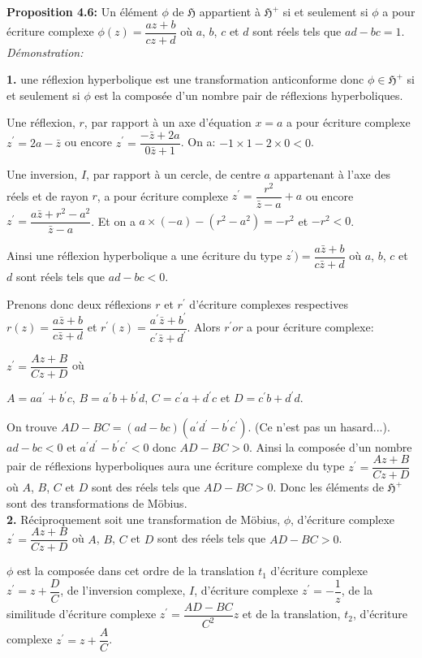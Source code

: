 \documentclass[a4paper, 12pt, twoside]{book}
\begin{document}
 \textbf{Proposition 4.6:} Un élément $\phi$ de \textbf{$\mathfrak{H}$} appartient à \textbf{$\mathfrak{H}^{+}$} si et seulement si $\phi$ a pour écriture complexe $\phi(z)=\dfrac{az+b}{cz+d}$ où $a$, $b$, $c$ et $d$ sont réels tels que $ad-bc=1$.\\
 
 
 \textit{Démonstration:}\
 
 \textbf{1.} une réflexion hyperbolique est une transformation anticonforme donc $\phi\in \mathfrak{H}^{+}$ si et seulement si  $\phi$ est la composée d'un nombre pair de réflexions hyperboliques.\
 
 Une réflexion, $r$, par rapport à un axe d'équation $x=a$ a pour écriture complexe $z^{'}=2a-\bar{z}$ ou encore  $z^{'}=\dfrac{-\bar{z}+2a}{0\bar{z}+1}$.  On a: $-1\times1-2\times 0<0$.\
 
  Une inversion, $I$, par rapport à un cercle, de centre $a$ appartenant à l'axe des réels et de rayon $r$,  a pour écriture complexe $z^{'}=\dfrac{r^{2}}{\bar{z}-a}+a$ ou encore  $z^{'}=\dfrac{a\bar{z}+r^{2}-a^{2}}{\bar{z}-a}$. Et on a $a\times (-a)-(r^{2}-a^{2})=-r^{2}$ et $-r^{2}<0$.
  
  Ainsi une réflexion hyperbolique a une écriture du type $z^{'})=\dfrac{a\bar{z}+b}{c\bar{z}+d}$ où $a$, $b$, $c$ et $d$ sont réels tels que $ad-bc<0$.\
  
  Prenons donc deux réflexions $r$ et $r^{'}$ d'écriture complexes respectives $r(z)=\dfrac{a\bar{z}+b}{c\bar{z}+d}$ et $r^{'}(z)=\dfrac{a^{'}\bar{z}+b^{'}}{c^{'}\bar{z}+d^{'}}$. Alors $r^{'}or$  a pour écriture complexe:\
  
  $z^{'}=\dfrac{Az+B}{Cz+D}$ où\
  
  $A=aa^{'}+b^{'}c$, $B=a^{'}b+b^{'}d$, $C=c^{'}a+d^{'}c$ et $D=c^{'}b+d^{'}d$.\
  
  On trouve $AD-BC=(ad-bc)(a^{'}d^{'}-b^{'}c^{'})$. (Ce n'est pas un hasard...).\
  $ad-bc<0$ et $a^{'}d^{'}-b^{'}c^{'}<0$ donc $AD-BC>0$. Ainsi la composée d'un nombre pair de réflexions hyperboliques aura une écriture complexe du type  $z^{'}=\dfrac{Az+B}{Cz+D}$ où $A$, $B$, $C$ et $D$ sont des réels tels que $AD-BC>0$. Donc les éléments de \textbf{$\mathfrak{H}^{+}$} sont des transformations de Möbius.\\
  
\textbf{2.}  Réciproquement soit une transformation de Möbius, $\phi$, d'écriture complexe $z^{'}=\dfrac{Az+B}{Cz+D}$ où $A$, $B$, $C$ et $D$ sont des réels tels que $AD-BC>0$.\
  
  $\phi$ est la composée dans cet ordre de la translation $t_{1}$ d'écriture complexe $z^{'}=z+\dfrac{D}{C}$, de l'inversion complexe, $I$,  d'écriture complexe $z^{'}=-\dfrac{1}{z}$, de la similitude d'écriture complexe $z^{'}=\dfrac{AD-BC}{C^{2}}z$ et de la translation, $t_{2}$, d'écriture complexe $z^{'}=z+\dfrac{A}{C}$.\\
  
\end{document}
